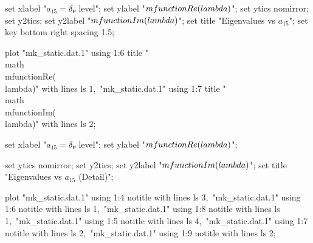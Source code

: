 \startGNUPLOTscript[eigenvalues]
  set xlabel "$a_{15} = δₚ$ level";
  set ylabel "$\\mfunction{Re}(\\lambda)$";
  set ytics nomirror;
  set y2tics;
  set y2label "$\\mfunction{Im}(\\lambda)$";
  set title "Eigenvalues vs $a_{15}$";
  set key bottom right spacing 1.5;

  plot "mk_static.dat.1" using 1:6 title "\\math{\\mfunction{Re}(\\lambda)}" with lines ls 1,\
       "mk_static.dat.1" using 1:7 title "\\math{\\mfunction{Im}(\\lambda)}" with lines ls 2;
\stopGNUPLOTscript

  set xlabel "$a_{15} = δₚ$ level";
  set ylabel "$\\mfunction{Re}(\\lambda)$";

  set ytics nomirror;
  set y2tics;
  set y2label "$\\mfunction{Im}(\\lambda)$";
  set title "Eigenvalues vs $a_{15}$ (Detail)";

  plot "mk_static.dat.1" using 1:4 notitle with lines ls 3,\
       "mk_static.dat.1" using 1:6 notitle with lines ls 1,\
       "mk_static.dat.1" using 1:8 notitle with lines ls 1,\
       "mk_static.dat.1" using 1:5 notitle with lines ls 4,\
       "mk_static.dat.1" using 1:7 notitle with lines ls 2,\
       "mk_static.dat.1" using 1:9 notitle with lines ls 2;
\stopGNUPLOTscript
